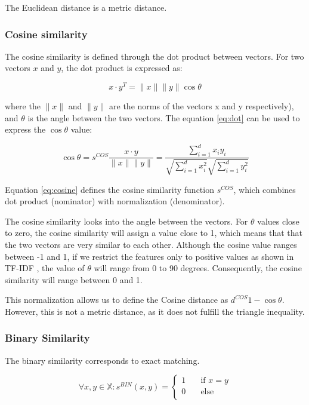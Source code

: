 The Euclidean distance is a metric distance\cite{Deza.Deza2009EncyclopediaofDistances}.

\subsubsection{Cosine similarity}
The cosine similarity is defined through the dot product between vectors. For two vectors $x$ and $y$, the dot product is expressed as:

\begin{equation}
	x\cdot y^{T} = \lVert x\lVert \lVert y\lVert \cos{\theta}
	\label{eq:dot}
\end{equation}


where the $\lVert x\lVert$ and $\lVert y\lVert$ are the norms of the vectors x and y respectively), 
and $\theta$ is the angle between the two vectors.
The equation \ref{eq:dot} can be used to express the $\cos \theta$ value:

\begin{equation}
	\cos \theta = s^{COS} \dfrac{x \cdot y}{\lVert x\lVert \lVert y\lVert} = 
	\dfrac{\sum_{i=1}^{d}x_{i}y_{i}}{\sqrt{\sum_{i=1}^{d} x_{i}^{2}}\sqrt{\sum_{i=1}^{d} y_{i}^{2}}}
	\label{eq:cosine}
\end{equation} 

Equation \ref{eq:cosine} defines the cosine similarity function $s^{COS}$, which combines dot product (nominator) with normalization (denominator).

The cosine similarity looks into the angle between the vectors. 
For $\theta$ values close to zero, the cosine similarity will assign a value close to 1, which means that that the two vectors are very similar to each other. 
Although the cosine value ranges between -1 and 1, if we restrict the features only to positive values as shown in TF-IDF 
, the value of $\theta$ will range from 0 to 90 degrees. 
Consequently, the cosine similarity will range between 0 and 1.

This normalization allows us to define the Cosine distance as 
$d^{COS}1 - \cos \theta$. 
However, this is not a metric distance, as it does not fulfill the triangle inequality.

\subsubsection{Binary Similarity}
The binary similarity corresponds to exact matching. 

\begin{equation}
\forall x,y \in \mathds{X}: s^{BIN}(x,y)=
\begin{cases}
1  & \quad \text{if } x=y \\
0  & \quad \text{else }\\
\end{cases}
\label{eq:binary} 
\end{equation}

